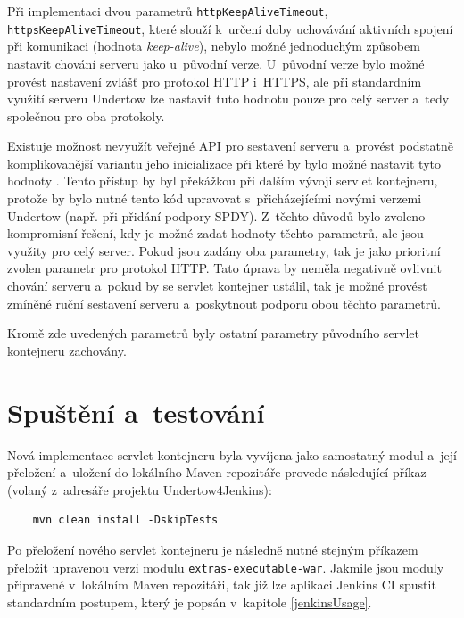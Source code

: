         
        Při implementaci dvou parametrů \texttt{httpKeepAliveTimeout}, \texttt{httpsKeepAliveTimeout}, které slouží 
        k~určení doby uchovávání aktivních spojení při komunikaci (hodnota \emph{keep-alive}), nebylo možné jednoduchým způsobem
        nastavit chování serveru jako u~původní verze. U~původní verze bylo možné provést nastavení zvlášť pro
        protokol HTTP i~HTTPS, ale při standardním využití serveru Undertow lze nastavit tuto hodnotu pouze pro celý
        server a~tedy společnou pro oba protokoly. 
        
        Existuje možnost nevyužít veřejné API pro sestavení serveru 
        a~provést podstatně komplikovanější variantu jeho inicializace při které by bylo možné nastavit tyto hodnoty \cite{undertowAssembly}.
        Tento přístup by byl překážkou při dalším vývoji servlet kontejneru, protože by bylo nutné tento
        kód upravovat s~přicházejícími novými verzemi Undertow (např. při přidání podpory SPDY). 
        Z~těchto důvodů bylo zvoleno kompromisní řešení, kdy je možné zadat hodnoty těchto parametrů, ale
        jsou využity pro celý server. Pokud jsou zadány oba parametry, tak je jako prioritní zvolen
        parametr pro protokol HTTP. Tato úprava by neměla negativně ovlivnit chování serveru a~pokud
        by se servlet kontejner ustálil, tak je možné provést zmíněné ruční sestavení serveru a~poskytnout
        podporu obou těchto parametrů.
          
        Kromě zde uvedených parametrů byly ostatní parametry původního servlet kontejneru zachovány.



    \section{Spuštění a~testování}
        Nová implementace servlet kontejneru byla vyvíjena jako samostatný modul a~její přeložení
        a~uložení do lokálního Maven repozitáře provede následující příkaz (volaný z~adresáře projektu
        Undertow4Jenkins):

\begin{verbatim}
    mvn clean install -DskipTests
\end{verbatim}
    
    Po přeložení nového servlet kontejneru je následně nutné stejným příkazem přeložit upravenou
    verzi modulu \texttt{extras-executable-war}. Jakmile jsou moduly připravené
    v~lokálním Maven repozitáři, tak již lze aplikaci Jenkins CI spustit standardním postupem,
    který je popsán v~kapitole \ref{jenkinsUsage}.


